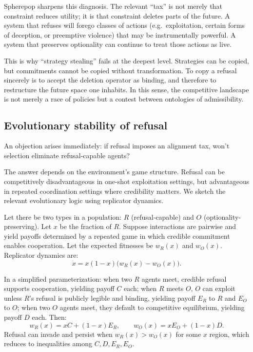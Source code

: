\documentclass[11pt]{article}
\begin{document}
Spherepop sharpens this diagnosis. The relevant ``tax'' is not merely that
constraint reduces utility; it is that constraint deletes parts of the future.
A system that refuses will forego classes of actions (e.g.\ exploitation, certain
forms of deception, or preemptive violence) that may be instrumentally powerful.
A system that preserves optionality can continue to treat those actions as live.

This is why ``strategy stealing'' fails at the deepest level. Strategies can be
copied, but commitments cannot be copied without transformation. To copy a
refusal sincerely is to accept the deletion operator as binding, and therefore
to restructure the future space one inhabits. In this sense, the competitive
landscape is not merely a race of policies but a contest between ontologies of
admissibility.

\subsection{Evolutionary stability of refusal}
\label{sec:evo}

An objection arises immediately: if refusal imposes an alignment tax, won't
selection eliminate refusal-capable agents?

The answer depends on the environment's game structure. Refusal can be
competitively disadvantageous in one-shot exploitation settings, but
advantageous in repeated coordination settings where credibility matters.
We sketch the relevant evolutionary logic using replicator dynamics.

Let there be two types in a population: $R$ (refusal-capable) and $O$
(optionality-preserving). Let $x$ be the fraction of $R$. Suppose interactions
are pairwise and yield payoffs determined by a repeated game in which credible
commitment enables cooperation. Let the expected fitnesses be $w_R(x)$ and
$w_O(x)$. Replicator dynamics are:
\[
\dot{x} = x(1-x)\bigl(w_R(x) - w_O(x)\bigr).
\]

In a simplified parameterization: when two $R$ agents meet, credible refusal
supports cooperation, yielding payoff $C$ each; when $R$ meets $O$, $O$ can
exploit unless $R$'s refusal is publicly legible and binding, yielding payoff
$E_R$ to $R$ and $E_O$ to $O$; when two $O$ agents meet, they default to
competitive equilibrium, yielding payoff $D$ each. Then:
\[
w_R(x) = xC + (1-x)E_R,
\qquad
w_O(x) = xE_O + (1-x)D.
\]
Refusal can invade and persist when $w_R(x) > w_O(x)$ for some $x$ region,
which reduces to inequalities among $C,D,E_R,E_O$.
\end{document}
